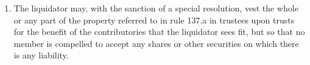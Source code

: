 \begin{enumerate}[label=(\alph*)]
    \item The liquidator may, with the sanction of a special resolution, vest the whole or any part of the property referred to in rule 137.a in trustees upon trusts for the benefit of the contributories that the liquidator sees fit, but so that no member is compelled to accept any shares or other securities on which there is any liability.
\end{enumerate} 